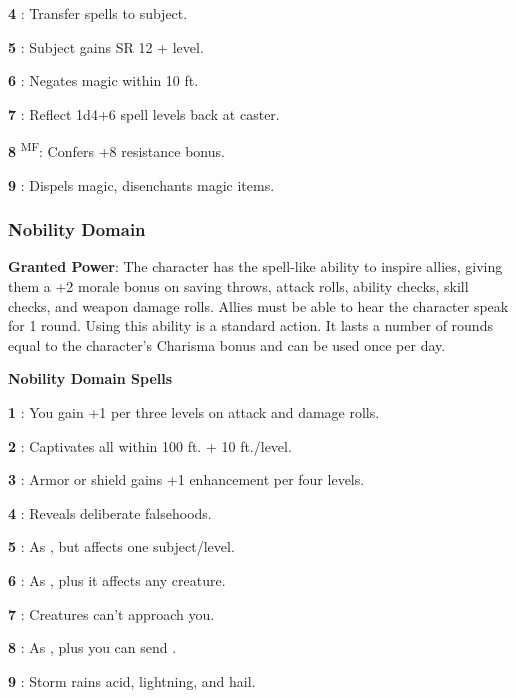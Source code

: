\textbf{4} : Transfer spells to subject.

\textbf{5} : Subject gains SR 12 + level.

\textbf{6} : Negates magic within 10 ft.

\textbf{7} : Reflect 1d4+6 spell levels back at caster.

\textbf{8} \textsuperscript{M}\textsuperscript{F}: Confers +8 resistance bonus.

\textbf{9} : Dispels magic, disenchants magic items.

\subsubsection{Nobility Domain}

\textbf{Granted Power}: The character has the spell-like ability to inspire allies, giving them a +2 morale bonus on saving throws, attack rolls, ability checks, skill checks, and weapon damage rolls. Allies must be able to hear the character speak for 1 round. Using this ability is a standard action. It lasts a number of rounds equal to the character's Charisma bonus and can be used once per day.

\textbf{Nobility Domain Spells}

\textbf{1} : You gain +1 per three levels on attack and damage rolls.

\textbf{2} : Captivates all within 100 ft. + 10 ft./level.

\textbf{3} : Armor or shield gains +1 enhancement per four levels.

\textbf{4} : Reveals deliberate falsehoods.

\textbf{5} : As , but affects one subject/level.

\textbf{6} : As , plus it affects any creature.

\textbf{7} : Creatures can't approach you.

\textbf{8} : As , plus you can send .

\textbf{9} : Storm rains acid, lightning, and hail.

